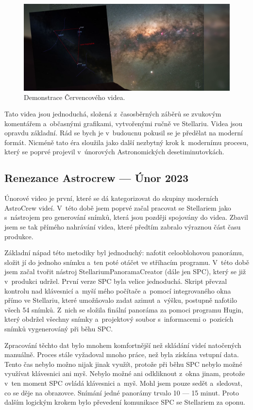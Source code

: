\documentclass[12pt,a4paper,titlepage]{article}
\begin{document}
\begin{figure}[ht]
	\centering
	\includegraphics[width=.85\textwidth]{cervenec.png}
	\caption{Demonstrace Červencového videa.}\label{img:cervenec}
\end{figure}

Tato videa jsou jednoduchá, složená z~časosběrných záběrů se zvukovým komentářem a~občasnými grafikami, vytvořenými ručně ve Stellariu. Videa jsou opravdu základní. Rád se bych je v~budoucnu pokusil se je předělat na moderní formát. Nicméně tato éra sloužila jako další nezbytný krok k~modernímu procesu, který se poprvé projevil v~únorových Astronomických desetiminutovkách.
\subsection{Renezance Astrocrew --- Únor 2023}
Únorové video je první, které se dá kategorizovat do skupiny moderních AstroCrew videí. V~této době jsem poprvé začal pracovat se Stellariem jako s~nástrojem pro generování snímků, která jsou později spojovány do videa. Zbavil jsem se tak přímého nahrávání videa, které předtím zabralo výraznou část času produkce.

Základní nápad této metodiky byl jednoduchý: nafotit celooblohovou panorámu, složit jí do jednoho snímku a~ten poté otáčet ve stříhacím programu. V~této době jsem začal tvořit nástroj StellariumPanoramaCreator (dále jen SPC), který se již v~produkci udržel. První verze SPC byla velice jednoduchá. Skript převzal kontrolu nad klávesnicí a~myší mého počítače a~pomocí integrovaného okna přímo ve Stellariu, které umožňovalo zadat azimut a~výšku, postupně nafotilo všech 54 snímků. Z~nich se složila finální panoráma za pomoci programu Hugin, který obdržel všechny snímky a~projektový soubor s~informacemi o~pozicích snímků vygenerováný při běhu SPC.\@

Zpracování těchto dat bylo mnohem komfortnější než skládání videí natočených manuálně. Proces stále vyžadoval mnoho práce, než byla získána vstupní data. Tento čas nebylo možno nijak jinak využít, protože při běhu SPC nebylo možné využívat klávesnici ani myš. Nebylo možné ani odkliknout z~okna jinam, protože v~ten moment SPC ovládá klávesnici a~myš. Mohl jsem pouze sedět a~sledovat, co se děje na obrazovce. Snímání jedné panorámy trvalo 10 --- 15 minut. Proto dalším logickým krokem bylo převedení komunikace SPC se Stellariem za oponu. 
\end{document}
